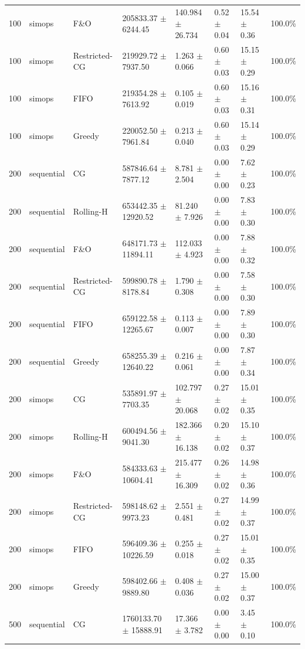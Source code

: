 \begin{tabular}{rlllllll}
100 & simops & F\&O & 205833.37 $\pm$ 6244.45 & 140.984 $\pm$ 26.734 & 0.52 $\pm$ 0.04 & 15.54 $\pm$ 0.36 & 100.0\% \\
100 & simops & Restricted-CG & 219929.72 $\pm$ 7937.50 & 1.263 $\pm$ 0.066 & 0.60 $\pm$ 0.03 & 15.15 $\pm$ 0.29 & 100.0\% \\
100 & simops & FIFO & 219354.28 $\pm$ 7613.92 & 0.105 $\pm$ 0.019 & 0.60 $\pm$ 0.03 & 15.16 $\pm$ 0.31 & 100.0\% \\
100 & simops & Greedy & 220052.50 $\pm$ 7961.84 & 0.213 $\pm$ 0.040 & 0.60 $\pm$ 0.03 & 15.14 $\pm$ 0.29 & 100.0\% \\
200 & sequential & CG & 587846.64 $\pm$ 7877.12 & 8.781 $\pm$ 2.504 & 0.00 $\pm$ 0.00 & 7.62 $\pm$ 0.23 & 100.0\% \\
200 & sequential & Rolling-H & 653442.35 $\pm$ 12920.52 & 81.240 $\pm$ 7.926 & 0.00 $\pm$ 0.00 & 7.83 $\pm$ 0.30 & 100.0\% \\
200 & sequential & F\&O & 648171.73 $\pm$ 11894.11 & 112.033 $\pm$ 4.923 & 0.00 $\pm$ 0.00 & 7.88 $\pm$ 0.32 & 100.0\% \\
200 & sequential & Restricted-CG & 599890.78 $\pm$ 8178.84 & 1.790 $\pm$ 0.308 & 0.00 $\pm$ 0.00 & 7.58 $\pm$ 0.30 & 100.0\% \\
200 & sequential & FIFO & 659122.58 $\pm$ 12265.67 & 0.113 $\pm$ 0.007 & 0.00 $\pm$ 0.00 & 7.89 $\pm$ 0.30 & 100.0\% \\
200 & sequential & Greedy & 658255.39 $\pm$ 12640.22 & 0.216 $\pm$ 0.061 & 0.00 $\pm$ 0.00 & 7.87 $\pm$ 0.34 & 100.0\% \\
200 & simops & CG & 535891.97 $\pm$ 7703.35 & 102.797 $\pm$ 20.068 & 0.27 $\pm$ 0.02 & 15.01 $\pm$ 0.35 & 100.0\% \\
200 & simops & Rolling-H & 600494.56 $\pm$ 9041.30 & 182.366 $\pm$ 16.138 & 0.20 $\pm$ 0.02 & 15.10 $\pm$ 0.37 & 100.0\% \\
200 & simops & F\&O & 584333.63 $\pm$ 10604.41 & 215.477 $\pm$ 16.309 & 0.26 $\pm$ 0.02 & 14.98 $\pm$ 0.36 & 100.0\% \\
200 & simops & Restricted-CG & 598148.62 $\pm$ 9973.23 & 2.551 $\pm$ 0.481 & 0.27 $\pm$ 0.02 & 14.99 $\pm$ 0.37 & 100.0\% \\
200 & simops & FIFO & 596409.36 $\pm$ 10226.59 & 0.255 $\pm$ 0.018 & 0.27 $\pm$ 0.02 & 15.01 $\pm$ 0.35 & 100.0\% \\
200 & simops & Greedy & 598402.66 $\pm$ 9889.80 & 0.408 $\pm$ 0.036 & 0.27 $\pm$ 0.02 & 15.00 $\pm$ 0.37 & 100.0\% \\
500 & sequential & CG & 1760133.70 $\pm$ 15888.91 & 17.366 $\pm$ 3.782 & 0.00 $\pm$ 0.00 & 3.45 $\pm$ 0.10 & 100.0\% \\

\end{tabular}

